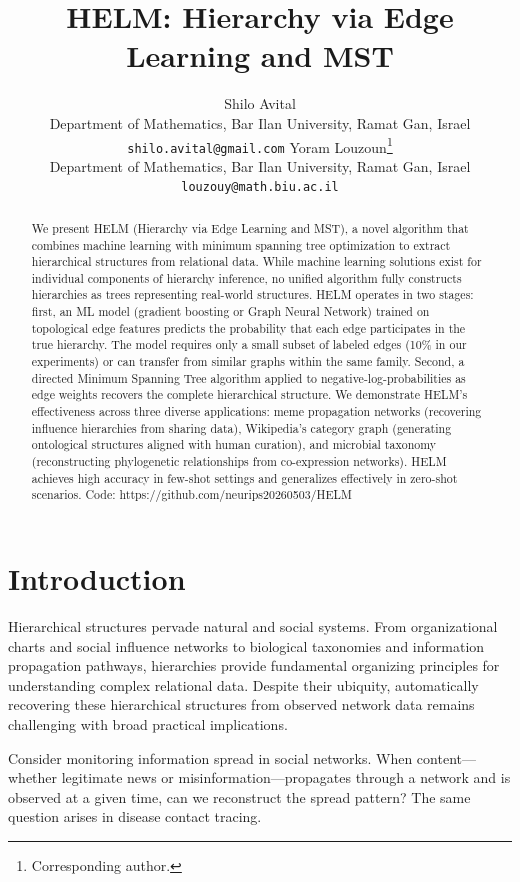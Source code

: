 \documentclass{article}
\title{HELM: Hierarchy via Edge Learning and MST}
\author{%
  Shilo Avital \\
  Department of Mathematics, Bar Ilan University, Ramat Gan, Israel \\
  \texttt{shilo.avital@gmail.com}
  \And
  Yoram Louzoun\thanks{Corresponding author.} \\
  Department of Mathematics, Bar Ilan University, Ramat Gan, Israel \\
  \texttt{louzouy@math.biu.ac.il}
}
\begin{document}
\maketitle

\begin{abstract}
        We present HELM (Hierarchy via Edge Learning and MST), a novel algorithm that combines machine learning with minimum spanning tree optimization to extract hierarchical structures from relational data. While machine learning solutions exist for individual components of hierarchy inference, no unified algorithm fully constructs hierarchies as trees representing real-world structures. HELM operates in two stages: first, an ML model (gradient boosting or Graph Neural Network) trained on topological edge features predicts the probability that each edge participates in the true hierarchy. The model requires only a small subset of labeled edges (10\% in our experiments) or can transfer from similar graphs within the same family. Second, a directed Minimum Spanning Tree algorithm applied to negative-log-probabilities as edge weights recovers the complete hierarchical structure. We demonstrate HELM's effectiveness across three diverse applications: meme propagation networks (recovering influence hierarchies from sharing data), Wikipedia's category graph (generating ontological structures aligned with human curation), and microbial taxonomy (reconstructing phylogenetic relationships from co-expression networks). HELM achieves high accuracy in few-shot settings and generalizes effectively in zero-shot scenarios. Code: https://github.com/neurips20260503/HELM
\end{abstract}

    \section{Introduction}
    Hierarchical structures pervade natural and social systems. From organizational charts and social influence networks to biological taxonomies and information propagation pathways, hierarchies provide fundamental organizing principles for understanding complex relational data. Despite their ubiquity, automatically recovering these hierarchical structures from observed network data remains challenging with broad practical implications.

    Consider monitoring information spread in social networks. When content—whether legitimate news or misinformation—propagates through a network and is observed at a given time, can we reconstruct the spread pattern? The same question arises in disease contact tracing.
\end{document}
